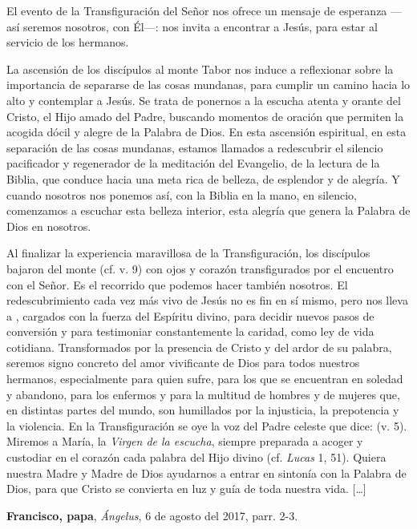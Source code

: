 \label{b2-03-02-2006A}

\begin{patercite}
El evento de la Transfiguración del Señor nos ofrece un mensaje de esperanza ---así seremos nosotros, con Él---: nos invita a encontrar a Jesús, para estar al servicio de los hermanos.

La ascensión de los discípulos al monte Tabor nos induce a reflexionar sobre la importancia de separarse de las cosas mundanas, para cumplir un camino hacia lo alto y contemplar a Jesús. Se trata de ponernos a la escucha atenta y orante del Cristo, el Hijo amado del Padre, buscando momentos de oración que permiten la acogida dócil y alegre de la Palabra de Dios. En esta ascensión espiritual, en esta separación de las cosas mundanas, estamos llamados a redescubrir el silencio pacificador y regenerador de la meditación del Evangelio, de la lectura de la Biblia, que conduce hacia una meta rica de belleza, de esplendor y de alegría. Y cuando nosotros nos ponemos así, con la Biblia en la mano, en silencio, comenzamos a escuchar esta belleza interior, esta alegría que genera la Palabra de Dios en nosotros.

Al finalizar la experiencia maravillosa de la Transfiguración, los discípulos bajaron del monte (cf. v. 9) con ojos y corazón transfigurados por el encuentro con el Señor. Es el recorrido que podemos hacer también nosotros. El redescubrimiento cada vez más vivo de Jesús no es fin en sí mismo, pero nos lleva a , cargados con la fuerza del Espíritu divino, para decidir nuevos pasos de conversión y para testimoniar constantemente la caridad, como ley de vida cotidiana. Transformados por la presencia de Cristo y del ardor de su palabra, seremos signo concreto del amor vivificante de Dios para todos nuestros hermanos, especialmente para quien sufre, para los que se encuentran en soledad y abandono, para los enfermos y para la multitud de hombres y de mujeres que, en distintas partes del mundo, son humillados por la injusticia, la prepotencia y la violencia. En la Transfiguración se oye la voz del Padre celeste que dice:  (v. 5). Miremos a María, la \emph{Virgen de la escucha}, siempre
preparada a acoger y custodiar en el corazón cada palabra del Hijo divino (cf. \emph{Lucas} 1, 51). Quiera nuestra Madre y Madre de Dios
ayudarnos a entrar en sintonía con la Palabra de Dios, para que Cristo se convierta en luz y guía de toda nuestra vida. [\ldots]

\textbf{Francisco, papa}, \textit{Ángelus}, 6 de agosto del 2017, parr. 2-3.
\end{patercite}
\newpage


